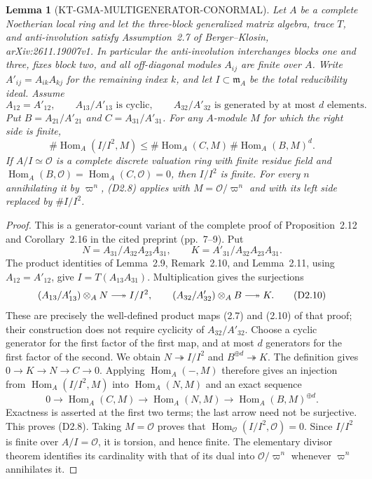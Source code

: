 \documentclass[11pt,a4paper]{article}
\newtheorem{lemma}[theorem]{Lemma}
\theoremstyle{definition}
\providecommand{\longtwoheadrightarrow}{\relbar\joinrel\twoheadrightarrow}
\begin{document}
\begin{lemma}[KT-GMA-MULTIGENERATOR-CONORMAL]
Let $A$ be a complete Noetherian local ring and let the
three-block generalized matrix algebra, trace $T$, and
anti-involution satisfy Assumption~2.7 of Berger--Klosin,
arXiv:2611.19007v1.  In particular the anti-involution
interchanges blocks one and three, fixes block two, and all
off-diagonal modules $A_{ij}$ are finite over $A$.
Write $A'_{ij}=A_{ik}A_{kj}$ for the remaining index $k$, and
let $I\subset\mathfrak m_A$ be the total reducibility ideal.
Assume
\[
 A_{12}=A'_{12},\qquad
 A_{13}/A'_{13}\text{ is cyclic},\qquad
 A_{32}/A'_{32}\text{ is generated by at most }d\text{ elements}.
                                                               \tag{D2.7}
\]
Put $B=A_{21}/A'_{21}$ and $C=A_{31}/A'_{31}$.
For any $A$-module $M$ for which the right side is finite,
\[
 \#\operatorname{Hom}_A(I/I^2,M)
 \leq\#\operatorname{Hom}_A(C,M)\,
       \#\operatorname{Hom}_A(B,M)^d.                         \tag{D2.8}
\]
If $A/I\simeq\mathcal O$ is a complete discrete valuation
ring with finite residue field and
$\operatorname{Hom}_A(B,\mathcal O)=
 \operatorname{Hom}_A(C,\mathcal O)=0$, then $I/I^2$ is finite.
For every $n$ annihilating it by $\varpi^n$, (D2.8) applies
with $M=\mathcal O/\varpi^n$ and with its left side replaced
by $\#I/I^2$.
\end{lemma}

\begin{proof}
This is a generator-count variant of the complete proof of
Proposition~2.12 and Corollary~2.16 in the cited preprint
(pp.~7--9).  Put
\[
 N=A_{31}/A_{32}A_{23}A_{31},\qquad
 K=A'_{31}/A_{32}A_{23}A_{31}.                                \tag{D2.9}
\]
The product identities of Lemma~2.9, Remark~2.10, and
Lemma~2.11, using
$A_{12}=A'_{12}$, give $I=T(A_{13}A_{31})$.
Multiplication gives the surjections
\[
 (A_{13}/A'_{13})\otimes_A N\longtwoheadrightarrow I/I^2,
 \qquad
 (A_{32}/A'_{32})\otimes_A B\longtwoheadrightarrow K.          \tag{D2.10}
\]
These are precisely the well-defined product maps (2.7) and
(2.10) of that proof; their construction does not require
cyclicity of $A_{32}/A'_{32}$.
Choose a cyclic generator for the first factor of the first
map, and at most $d$ generators for the first factor of the
second.  We obtain $N\twoheadrightarrow I/I^2$ and
$B^{\oplus d}\twoheadrightarrow K$.
The definition gives $0\to K\to N\to C\to0$.
Applying $\operatorname{Hom}_A(-,M)$ therefore gives an
injection from $\operatorname{Hom}_A(I/I^2,M)$ into
$\operatorname{Hom}_A(N,M)$ and an exact sequence
\[
 0\longrightarrow\operatorname{Hom}_A(C,M)
 \longrightarrow\operatorname{Hom}_A(N,M)
 \longrightarrow\operatorname{Hom}_A(B,M)^{\oplus d}.          \tag{D2.11}
\]
Exactness is asserted at the first two terms; the last arrow
need not be surjective.  This proves (D2.8).
Taking $M=\mathcal O$ proves that
$\operatorname{Hom}_{\mathcal O}(I/I^2,\mathcal O)=0$.
Since $I/I^2$ is finite over $A/I=\mathcal O$, it is torsion,
and hence finite.  The elementary divisor theorem identifies
its cardinality with that of its dual into
$\mathcal O/\varpi^n$ whenever $\varpi^n$ annihilates it.
\end{proof}
\end{document}
